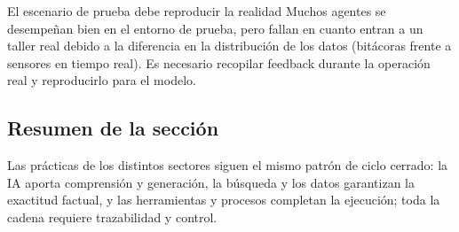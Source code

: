 \begin{warningbox}{El escenario de prueba debe reproducir la realidad}
Muchos agentes se desempeñan bien en el entorno de prueba, pero fallan en cuanto entran a un taller real debido a la diferencia en la distribución de los datos (bitácoras frente a sensores en tiempo real). Es necesario recopilar feedback durante la operación real y reproducirlo para el modelo.
\end{warningbox}

\subsection{Resumen de la sección}

Las prácticas de los distintos sectores siguen el mismo patrón de ciclo cerrado: la IA aporta comprensión y generación, la búsqueda y los datos garantizan la exactitud factual, y las herramientas y procesos completan la ejecución; toda la cadena requiere trazabilidad y control.

